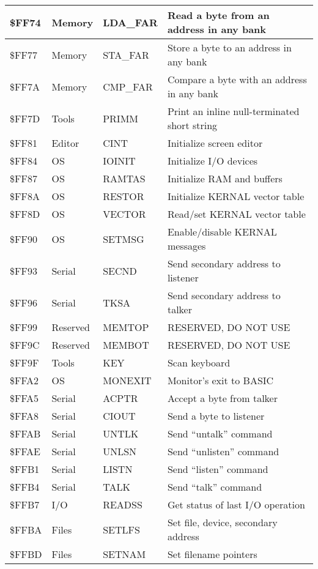 \begin{longtable}{|L{2cm}|p{2cm}|p{2cm}|L{6cm}|}
\hline
\$FF74 & Memory & LDA\_FAR & Read a byte from an address in any bank \\
\hline
\$FF77 & Memory & STA\_FAR & Store a byte to an address in any bank \\
\hline
\$FF7A & Memory & CMP\_FAR & Compare a byte with an address in any bank \\
\hline
\$FF7D & Tools & PRIMM & Print an inline null-terminated short string \\
\hline
\$FF81 & Editor & CINT & Initialize screen editor \\
\hline
\$FF84 & OS & IOINIT & Initialize I/O devices \\
\hline
\$FF87 & OS & RAMTAS & Initialize RAM and buffers \\
\hline
\$FF8A & OS & RESTOR & Initialize KERNAL vector table \\
\hline
\$FF8D & OS & VECTOR & Read/set KERNAL vector table \\
\hline
\$FF90 & OS & SETMSG & Enable/disable KERNAL messages \\
\hline
\$FF93 & Serial & SECND & Send secondary address to listener \\
\hline
\$FF96 & Serial & TKSA & Send secondary address to talker \\
\hline
\$FF99 & Reserved & MEMTOP & RESERVED, DO NOT USE \\
\hline
\$FF9C & Reserved & MEMBOT & RESERVED, DO NOT USE \\
\hline
\$FF9F & Tools & KEY & Scan keyboard \\
\hline
\$FFA2 & OS & MONEXIT & Monitor's exit to BASIC \\
\hline
\$FFA5 & Serial & ACPTR & Accept a byte from talker \\
\hline
\$FFA8 & Serial & CIOUT & Send a byte to listener \\
\hline
\$FFAB & Serial & UNTLK & Send ``untalk'' command \\
\hline
\$FFAE & Serial & UNLSN & Send ``unlisten'' command \\
\hline
\$FFB1 & Serial & LISTN & Send ``listen'' command \\
\hline
\$FFB4 & Serial & TALK & Send ``talk'' command \\
\hline
\$FFB7 & I/O & READSS & Get status of last I/O operation \\
\hline
\$FFBA & Files & SETLFS & Set file, device, secondary address \\
\hline
\$FFBD & Files & SETNAM & Set filename pointers \\

\end{longtable}
